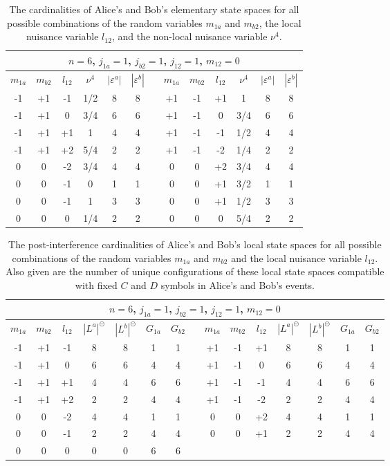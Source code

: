 \documentclass{article}
\begin{document}
\begin{table}[h]
\begin{centering}
\begin{tabular}{|c|c|c|c|c|c|c|c|c|c|c|c|c|}
\hline 
\multicolumn{13}{|c|}{$n=6$, $j_{1a}=1$, $j_{b2}=1$, $j_{12}=1$, $m_{12}=0$}\tabularnewline
\hline 
$m_{1a}$ & $m_{b2}$ & $l_{12}$ & $\nu^{4}$ & $|\varepsilon^{a}|$ & $|\varepsilon^{b}|$ &  & $m_{1a}$ & $m_{b2}$ & $l_{12}$ & $\nu^{4}$ & $|\varepsilon^{a}|$ & $|\varepsilon^{b}|$\tabularnewline
\cline{1-6} \cline{8-13} 
-1 & +1 & -1 & 1/2 & 8 & 8 &  & +1 & -1 & +1 & 1 & 8 & 8\tabularnewline
-1 & +1 & 0 & 3/4 & 6 & 6 &  & +1 & -1 & 0 & 3/4 & 6 & 6\tabularnewline
-1 & +1 & +1 & 1 & 4 & 4 &  & +1 & -1 & -1 & 1/2 & 4 & 4\tabularnewline
-1 & +1 & +2 & 5/4 & 2 & 2 &  & +1 & -1 & -2 & 1/4 & 2 & 2\tabularnewline
0 & 0 & -2 & 3/4 & 4 & 4 &  & 0 & 0 & +2 & 3/4 & 4 & 4\tabularnewline
0 & 0 & -1 & 0 & 1 & 1 &  & 0 & 0 & +1 & 3/2 & 1 & 1\tabularnewline
0 & 0 & -1 & 1 & 3 & 3 &  & 0 & 0 & +1 & 1/2 & 3 & 3\tabularnewline
0 & 0 & 0 & 1/4 & 2 & 2 &  & 0 & 0 & 0 & 5/4 & 2 & 2\tabularnewline
\hline 
\end{tabular}
\par\end{centering}
\caption{The cardinalities of Alice's and Bob's elementary state spaces for all possible combinations of the random variables $m_{1a}$ and $m_{b2}$, the local nuisance variable $l_{12}$, and the non-local nuisance variable $\nu^4$.}
\label{tab: sample epsilons 2}
\end{table}

\begin{table}[h]
\begin{centering}
\begin{tabular}{|c|c|c|c|c|c|c|c|c|c|c|c|c|c|c|}
\hline 
\multicolumn{15}{|c|}{$n=6$, $j_{1a}=1$, $j_{b2}=1$, $j_{12}=1$, $m_{12}=0$}\tabularnewline
\hline 
$m_{1a}$ & $m_{b2}$ & $l_{12}$ & $|L^{a}|^\circleddash$ & $|L^{b}|^\circleddash$ & $G_{1a}$ & $G_{b2}$ &  & $m_{1a}$ & $m_{b2}$ & $l_{12}$ & $|L^{a}|^\circleddash$ & $|L^{b}|^\circleddash$ & $G_{1a}$ & $G_{b2}$\tabularnewline
\cline{1-7} \cline{9-15} 
-1 & +1 & -1 & 8 & 8 & 1 & 1 &  & +1 & -1 & +1 & 8 & 8 & 1 & 1\tabularnewline
-1 & +1 & 0 & 6 & 6 & 4 & 4 &  & +1 & -1 & 0 & 6 & 6 & 4 & 4\tabularnewline
-1 & +1 & +1 & 4 & 4 & 6 & 6 &  & +1 & -1 & -1 & 4 & 4 & 6 & 6\tabularnewline
-1 & +1 & +2 & 2 & 2 & 4 & 4 &  & +1 & -1 & -2 & 2 & 2 & 4 & 4\tabularnewline
0 & 0 & -2 & 4 & 4 & 1 & 1 &  & 0 & 0 & +2 & 4 & 4 & 1 & 1\tabularnewline
0 & 0 & -1 & 2 & 2 & 4 & 4 &  & 0 & 0 & +1 & 2 & 2 & 4 & 4\tabularnewline
0 & 0 & 0 & 0 & 0 & 6 & 6 &  &  &  &  &  &  &  & \tabularnewline
\hline 
\end{tabular}
\par\end{centering}
\caption{The post-interference cardinalities of Alice's and Bob's local state spaces for all possible combinations of the random variables $m_{1a}$ and $m_{b2}$ and the local nuisance variable $l_{12}$. Also given are the number of unique configurations of these local state spaces compatible with fixed $C$ and $D$ symbols in Alice's and Bob's events.}
\label{tab: sample local 2}
\end{table}
\end{document}
